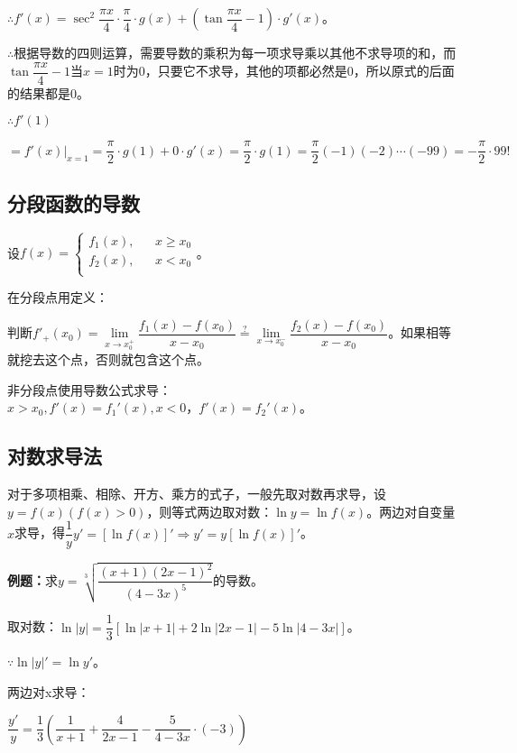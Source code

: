 \documentclass[UTF8, 12pt]{ctexart}
\begin{document}
$\therefore f'(x)=\sec^2\dfrac{\pi x}{4}\cdot\dfrac{\pi}{4}\cdot g(x)+\left(\tan\dfrac{\pi x}{4}-1\right)\cdot g'(x)$。\medskip

$\therefore$根据导数的四则运算，需要导数的乘积为每一项求导乘以其他不求导项的和，而$\tan\dfrac{\pi x}{4}-1$当$x=1$时为0，只要它不求导，其他的项都必然是0，所以原式的后面的结果都是0。

$\therefore f'(1)$

$=f'(x)\vert_{x=1}=\dfrac{\pi}{2}\cdot g(1)+0\cdot g'(x)=\dfrac{\pi}{2}\cdot g(1)=\dfrac{\pi}{2}(-1)(-2)\cdots(-99)=-\dfrac{\pi}{2}\cdot 99!$

\subsection{分段函数的导数}

设$f(x)=\left\{
    \begin{array}{lcl}
        f_1(x), & & x\geqslant x_0 \\
        f_2(x), & & x<x_0 \\
    \end{array}
\right.$。\medskip

在分段点用定义：

判断$f'_+(x_0)=\lim\limits_{x\to x_0^+}\dfrac{f_1(x)-f(x_0)}{x-x_0}\overset{?}{=}\lim\limits_{x\to x_0^-}\dfrac{f_2(x)-f(x_0)}{x-x_0}$。如果相等就挖去这个点，否则就包含这个点。

非分段点使用导数公式求导：$x>x_0,f'(x)=f_1'(x),x<0，f'(x)=f_2'(x)$。

\subsection{对数求导法}

对于多项相乘、相除、开方、乘方的式子，一般先取对数再求导，设$y=f(x)(f(x)>0)$，则等式两边取对数：$\ln y=\ln f(x)$。两边对自变量$x$求导，得$\dfrac{1}{y}y'=[\ln f(x)]'\Rightarrow y'=y[\ln f(x)]'$。

\textbf{例题：}求$y=\sqrt[3]{\dfrac{(x+1)(2x-1)^2}{(4-3x)^5}}$的导数。

取对数：$\ln\vert y\vert=\dfrac{1}{3}[\ln\vert x+1\vert+2\ln\vert 2x-1\vert-5\ln\vert 4-3x\vert]$。

$\because \ln\vert y\vert'=\ln y'$。

两边对x求导：\medskip

$\dfrac{y'}{y}=\dfrac{1}{3}\left(\dfrac{1}{x+1}+\dfrac{4}{2x-1}-\dfrac{5}{4-3x}\cdot(-3)\right)$
\end{document}
